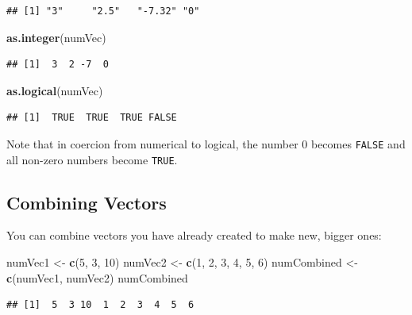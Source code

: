 \documentclass[]{book}
\makeatletter
\newenvironment{Shaded}{\begin{snugshade}}{\end{snugshade}}
\newcommand{\KeywordTok}[1]{\textcolor[rgb]{0.13,0.29,0.53}{\textbf{#1}}}
\newcommand{\DecValTok}[1]{\textcolor[rgb]{0.00,0.00,0.81}{#1}}
\newcommand{\StringTok}[1]{\textcolor[rgb]{0.31,0.60,0.02}{#1}}
\newcommand{\NormalTok}[1]{#1}
\newenvironment{kframe}{%
\medskip{}
\setlength{\fboxsep}{.8em}
 \def\at@end@of@kframe{}%
 \ifinner\ifhmode%
  \def\at@end@of@kframe{\end{minipage}}%
  \begin{minipage}{\columnwidth}%
 \fi\fi%
 \def\FrameCommand##1{\hskip\@totalleftmargin \hskip-\fboxsep
 \colorbox{shadecolor}{##1}\hskip-\fboxsep
     \hskip-\linewidth \hskip-\@totalleftmargin \hskip\columnwidth}%
 \MakeFramed {\advance\hsize-\width
   \@totalleftmargin\z@ \linewidth\hsize
   \@setminipage}}%
 {\par\unskip\endMakeFramed%
 \at@end@of@kframe}
\renewenvironment{Shaded}{\begin{kframe}}{\end{kframe}}
\theoremstyle{definition}
\theoremstyle{definition}
\theoremstyle{definition}
\theoremstyle{remark}
\makeatother
\begin{document}
\begin{verbatim}
## [1] "3"     "2.5"   "-7.32" "0"
\end{verbatim}

\begin{Shaded}
\begin{Highlighting}[]
\KeywordTok{as.integer}\NormalTok{(numVec)}
\end{Highlighting}
\end{Shaded}

\begin{verbatim}
## [1]  3  2 -7  0
\end{verbatim}

\begin{Shaded}
\begin{Highlighting}[]
\KeywordTok{as.logical}\NormalTok{(numVec)}
\end{Highlighting}
\end{Shaded}

\begin{verbatim}
## [1]  TRUE  TRUE  TRUE FALSE
\end{verbatim}

Note that in coercion from numerical to logical, the number 0 becomes
\texttt{FALSE} and all non-zero numbers become \texttt{TRUE}.

\subsection{Combining Vectors}\label{combining-vectors}

You can combine vectors you have already created to make new, bigger
ones:

\begin{Shaded}
\begin{Highlighting}[]
\NormalTok{numVec1 <-}\StringTok{ }\KeywordTok{c}\NormalTok{(}\DecValTok{5}\NormalTok{, }\DecValTok{3}\NormalTok{, }\DecValTok{10}\NormalTok{)}
\NormalTok{numVec2 <-}\StringTok{ }\KeywordTok{c}\NormalTok{(}\DecValTok{1}\NormalTok{, }\DecValTok{2}\NormalTok{, }\DecValTok{3}\NormalTok{, }\DecValTok{4}\NormalTok{, }\DecValTok{5}\NormalTok{, }\DecValTok{6}\NormalTok{)}
\NormalTok{numCombined <-}\StringTok{ }\KeywordTok{c}\NormalTok{(numVec1, numVec2)}
\NormalTok{numCombined}
\end{Highlighting}
\end{Shaded}

\begin{verbatim}
## [1]  5  3 10  1  2  3  4  5  6
\end{verbatim}
\end{document}
